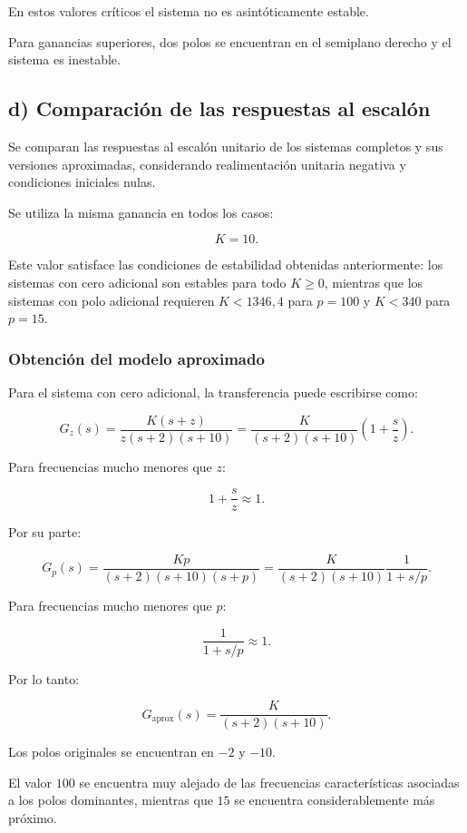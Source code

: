 \documentclass[12pt,a4paper]{article}
\begin{document}
En estos valores críticos el sistema no es
asintóticamente estable.

Para ganancias superiores, dos polos se encuentran
en el semiplano derecho y el sistema es inestable.



\subsection*{d) Comparación de las respuestas al escalón}

Se comparan las respuestas al escalón unitario de los
sistemas completos y sus versiones aproximadas,
considerando realimentación unitaria negativa y
condiciones iniciales nulas.

Se utiliza la misma ganancia en todos los casos:

\[
\boxed{K=10.}
\]

Este valor satisface las condiciones de estabilidad obtenidas
anteriormente: los sistemas con cero adicional son estables
para todo $K\geq0$, mientras que los sistemas con polo
adicional requieren $K<1346{,}4$ para $p=100$ y
$K<340$ para $p=15$.


\subsubsection*{Obtención del modelo aproximado}

Para el sistema con cero adicional, la transferencia puede
escribirse como:

\[
G_z(s)
=
\frac{K(s+z)}
{z(s+2)(s+10)}
=
\frac{K}
{(s+2)(s+10)}
\left(
1+\frac{s}{z}
\right).
\]

Para frecuencias mucho menores que $z$:

\[
1+\frac{s}{z}
\approx1.
\]

Por su parte:

\[
G_p(s)
=
\frac{Kp}
{(s+2)(s+10)(s+p)}
=
\frac{K}
{(s+2)(s+10)}
\frac{1}
{1+s/p}.
\]

Para frecuencias mucho menores que $p$:

\[
\frac{1}{1+s/p}
\approx1.
\]

Por lo tanto:

\[
\boxed{
G_{\mathrm{aprox}}(s)
=
\frac{K}
{(s+2)(s+10)}.
}
\]

Los polos originales se encuentran en $-2$ y $-10$.

El valor $100$ se encuentra muy alejado de las frecuencias
características asociadas a los polos dominantes, mientras
que $15$ se encuentra considerablemente más próximo.
\end{document}
